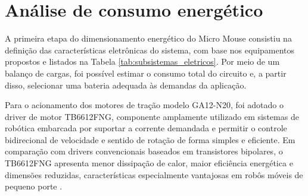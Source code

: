 \section{Análise de consumo energético}

A primeira etapa do dimensionamento energético do Micro Mouse consistiu na 
definição das características eletrônicas do sistema, com base nos equipamentos 
propostos e listados na Tabela \ref{tab:subsistemas_eletricos}. Por meio de um balanço de cargas, foi possível 
estimar o consumo total do circuito e, a partir disso, selecionar uma bateria 
adequada às demandas da aplicação.

\begin{table}[H]
    \centering
    \caption{Identificação dos Subsistemas Elétricos}
    \label{tab:subsistemas_eletricos}
\end{table}

Para o acionamento dos motores de tração modelo GA12-N20, foi adotado o driver 
de motor TB6612FNG, componente amplamente utilizado em sistemas de robótica 
embarcada por suportar a corrente demandada e permitir o controle bidirecional 
de velocidade e sentido de rotação de forma simples e eficiente. Em comparação 
com drivers convencionais baseados em transistores bipolares, o TB6612FNG 
apresenta menor dissipação de calor, maior eficiência energética e dimensões 
reduzidas, características especialmente vantajosas em robôs móveis de pequeno 
porte \cite{misra2018}.

